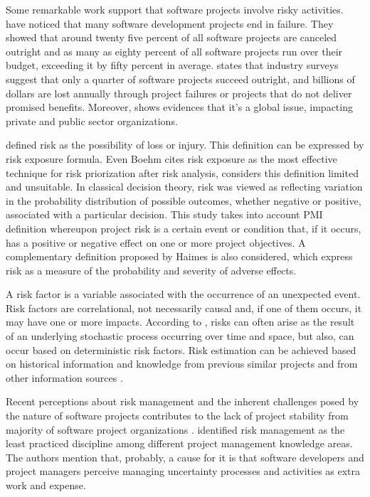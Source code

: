 \documentclass[a4paper,twoside]{article}
\begin{document}
Some remarkable work support that software projects involve risky activities. \cite{schmidt2001identifying} have noticed that many software development projects end in failure. They showed that around twenty five percent of all software projects are canceled outright and as many as eighty percent of all software projects run over their budget, exceeding it by fifty percent in average. \cite{bannerman2008risk} states that industry surveys suggest that only a quarter of software projects succeed outright, and billions of dollars are lost annually through project failures or projects that do not deliver promised benefits. Moreover, \cite{bannerman2008risk} shows evidences that it's a global issue, impacting private and public sector organizations.

\cite{BOEHM1991} defined risk as the possibility of loss or injury. This definition can be expressed by risk exposure formula. Even Boehm cites risk exposure as the most effective technique for risk priorization after risk analysis, \cite{bannerman2008risk} considers this definition limited and unsuitable. In classical decision theory, risk was viewed as reflecting variation in the probability distribution of possible outcomes, whether negative or positive, associated with a particular decision. This study takes into account PMI \cite{PMBOK2008} definition whereupon project risk is a certain event or condition that, if it occurs, has a positive or negative effect on one or more project objectives. A complementary definition proposed by Haimes \cite{haimes2011risk} is also considered, which express risk as a measure of the probability and severity of adverse effects.

A risk factor is a variable associated with the occurrence of an unexpected event. Risk factors are correlational, not necessarily causal and, if one of them occurs, it may have one or more impacts. According to \cite{haimes2011risk}, risks can often arise as the result of an underlying stochastic process occurring over time and space, but also, can occur based on deterministic risk factors. Risk estimation can be achieved based on historical information and knowledge from previous similar projects and from other information sources \cite{PMBOK2008}. 

Recent perceptions about risk management and the inherent challenges posed by the nature of software projects contributes to the lack of project stability from majority of software project organizations \cite{kwak2004project}. \cite{kwak2000calculating} identified risk management as the least practiced discipline among different project management knowledge areas. The authors mention that, probably, a cause for it is that software developers and project managers perceive managing uncertainty processes and activities as extra work and expense.
\end{document}
